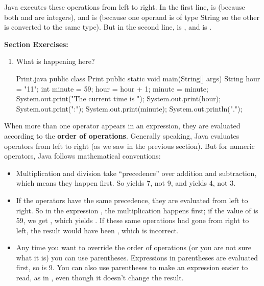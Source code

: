 Java executes these operations from left to right.
In the first line,  is  (because both  and  are integers), and  is  (because one operand is of type String so the other is converted to the same type).
But in the second line,  is , and  is .

\textbf{Section Exercises:}
\begin{enumerate}
\item  What is happening here?
\linebreak 

\begin{trinket}[270]{Print.java}
public class Print {
    public static void main(String[] args) {
        String hour = "11";
        int minute = 59;
        hour = hour + 1;
        minute = minute;
        System.out.print("The current time is ");
        System.out.print(hour);
        System.out.print(":");
        System.out.print(minute);
        System.out.println(".");
    }
}
\end{trinket}
\end{enumerate}




When more than one operator appears in an expression, they are evaluated according to the {\bf order of operations}.
Generally speaking, Java evaluates operators from left to right (as we saw in the previous section).
But for numeric operators, Java follows mathematical conventions:

\begin{itemize}

\item Multiplication and division take ``precedence'' over addition and subtraction, which means they happen first.
So  yields 7, not 9, and  yields 4, not 3.

\item If the operators have the same precedence, they are evaluated from left to right.
So in the expression , the multiplication happens first; if the value of  is 59, we get , which yields .
If these same operations had gone from right to left, the result would have been , which is incorrect.


\item Any time you want to override the order of operations (or you are not sure what it is) you can use parentheses.
Expressions in parentheses are evaluated first, so  is 9.
You can also use parentheses to make an expression easier to read, as in , even though it doesn't change the result.

\end{itemize}

